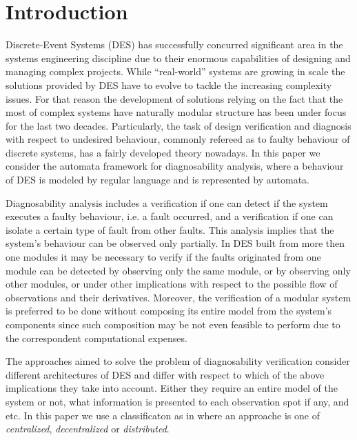 \documentclass[a4paper, 10pt, conference]{ieeeconf}
\begin{document}
\section{Introduction}

Discrete-Event Systems (DES) has successfully concurred significant area in the
systems engineering discipline due to their enormous capabilities of designing
and managing complex projects. While ``real-world'' systems are growing in scale
the solutions provided by DES have to evolve to tackle the increasing complexity
issues. For that reason the development of solutions relying on the fact that
the most of complex systems have naturally modular structure has been under
focus for the last two decades. Particularly, the task of design verification and
diagnosis with respect to undesired behaviour, commonly refereed as to faulty
behaviour of discrete systems, has a fairly developed theory nowadays.
In this paper we consider the automata framework for diagnosability analysis,
where a behaviour of DES is modeled by regular language and is represented
by automata.

Diagnosability analysis includes a verification if one can detect if the system
executes a faulty behaviour, i.e. a fault occurred, and a verification if one
can isolate a certain type of fault from other faults. This analysis implies
that the system's behaviour can be observed only partially. In DES built from more
then one modules it may be necessary to verify if the faults originated from one
module can be detected by observing only the same module, or by observing only
other modules, or under other implications with respect to the possible flow of
observations and their derivatives. Moreover, the verification of a modular
system is preferred to be done without composing its entire model from the
system's components since such composition may be not even feasible to perform
due to the correspondent computational expenses.

The approaches aimed to solve the problem of diagnosability verification
consider different architectures of DES and differ with respect to which of the
above implications they take into account. Either they require an entire model
of the system or not, what information is presented to each observation spot if
any, and etc. In this paper we use a classificaton as in
\cite{su_global_2005} where an approache is one of \emph{centralized},
\emph{decentralized} or \emph{distributed}.
\end{document}
